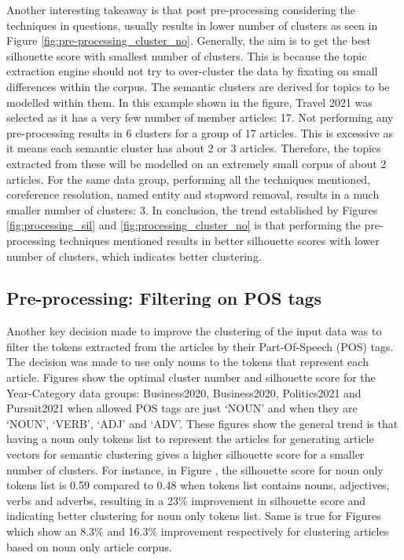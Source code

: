 Another interesting takeaway is that post pre-processing considering the techniques in questions, usually results in lower number of clusters as seen in Figure \ref{fig:pre-processing_cluster_no}. Generally, the aim is to get the best silhouette score with smallest number of clusters. This is because the topic extraction engine should not try to over-cluster the data by fixating on small differences within the corpus. The semantic clusters are derived for topics to be modelled within them. In this example shown in the figure, Travel 2021 was selected as it has a very few number of member articles: 17. Not performing any pre-processing results in 6 clusters for a group of 17 articles. This is excessive as it means each semantic cluster has about 2 or 3 articles. Therefore, the topics extracted from these will be modelled on an extremely small corpus of about 2 articles. For the same data group, performing all the techniques mentioned, coreference resolution, named entity and stopword removal, results in a much smaller number of clusters: 3. In conclusion, the trend established by Figures \ref{fig:processing_sil} and \ref{fig:processing_cluster_no} is that performing the pre-processing techniques mentioned results in better silhouette scores with lower number of clusters, which indicates better clustering. 


\subsection{Pre-processing: Filtering on POS tags} \label{s:pos_clustering}
Another key decision made to improve the clustering of the input data was to filter the tokens extracted from the articles by their Part-Of-Speech (POS) tags. The decision was made to use only nouns to the tokens that represent each article. Figures \label{fig:pos_business2020} \label{fig:pos_business2021}  \label{fig:pos_politics2021} \label{fig:pos_pursuit2021} show the optimal cluster number and silhouette score for the Year-Category data groups: Business2020, Business2020, Politics2021 and Pursuit2021 when allowed POS tags are just `NOUN' and when they are `NOUN', `VERB', `ADJ' and `ADV'. These figures show the general trend is that having a noun only tokens list to represent the articles for generating article vectors for semantic clustering gives a higher silhouette score for a smaller number of clusters. For instance, in Figure \label{fig:pos_business2021}, the silhouette score for noun only tokens list is 0.59 compared to 0.48 when tokens list contains nouns, adjectives, verbs and adverbs, resulting in a 23\% improvement in silhouette score and indicating better clustering for noun only tokens list. Same is true for Figures \label{fig:pos_politics2021} \label{fig:pos_pursuit2021} which show an 8.3\% and 16.3\% improvement respectively for clustering articles based on noun only article corpus.

